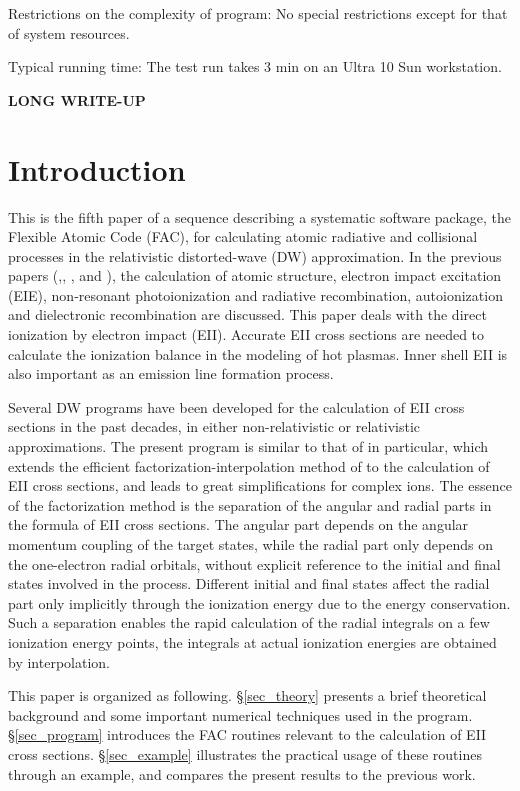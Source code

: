 \documentclass{elsart}
\begin{document}
Restrictions on the complexity of program: No special restrictions except for
that of system resources. 

Typical running time: The test run takes 3 min on an Ultra 10 Sun workstation.

\textbf{\large LONG WRITE-UP}

\section{Introduction}
This is the fifth paper of a sequence describing a systematic software
package, the Flexible Atomic Code (FAC), 
for calculating atomic radiative and collisional processes in the relativistic
distorted-wave (DW) approximation. In the previous papers
(\citep{gu01a},\citep{gu01b},
\citep{gu01c}, and \citep{gu01d}), the
calculation of atomic structure, electron impact excitation (EIE),
non-resonant photoionization and radiative recombination, autoionization and
dielectronic recombination are discussed. This paper deals with the direct
ionization by electron impact (EII). Accurate EII cross sections are needed
to calculate the ionization balance in the modeling of hot plasmas. Inner
shell EII is also important as an emission line formation process. 

Several DW programs have been developed for the calculation of EII cross
sections in the past decades, in either non-relativistic \citep{younger80} or
relativistic \citep{pindzola88, sampson91} approximations. The present program
is similar to that of 
\citet{sampson91} in particular,  which extends the
efficient factorization-interpolation method of \citet{barshalom88} to the
calculation of EII cross sections, and leads to great simplifications for
complex ions. The essence of the factorization method is the separation of
the angular and radial parts in the formula of EII cross sections. The angular
part depends on the angular momentum coupling of the target states, while the
radial part only depends on the one-electron radial orbitals, without
explicit reference to the initial and final states involved in the
process. Different initial and final states affect the radial part only
implicitly through the ionization energy due to the energy conservation. Such
a separation enables the rapid calculation of the radial integrals on a few
ionization energy points, the integrals at actual ionization energies are
obtained by interpolation.  

This paper is organized as following. 
\S\ref{sec_theory} presents a brief theoretical background and some important
numerical techniques used in the program. \S\ref{sec_program} introduces the
FAC routines relevant to the calculation of EII cross
sections. \S\ref{sec_example} illustrates the practical usage of these
routines through an example, and compares the present 
results to the previous work.
\end{document}
